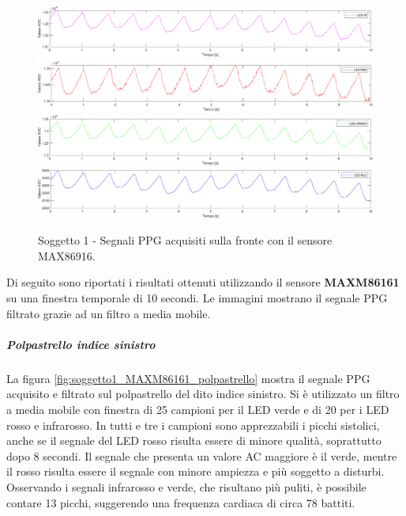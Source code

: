 \begin{figure}[h]
	\centering
	\includegraphics[width=1\linewidth]{ImageFiles/Misure Preliminari/Soggetto 1/MAX86916/fronte_ired}
	\includegraphics[width=1\linewidth]{ImageFiles/Misure Preliminari/Soggetto 1/MAX86916/fronte_red}
	\includegraphics[width=1\linewidth]{ImageFiles/Misure Preliminari/Soggetto 1/MAX86916/fronte_green}
	\includegraphics[width=1\linewidth]{ImageFiles/Misure Preliminari/Soggetto 1/MAX86916/fronte_blu}
	\caption{Soggetto 1 - Segnali PPG acquisiti sulla fronte con il sensore MAX86916.}
	\label{fig:soggetto1_MAX86916_fronte}
\end{figure}

\clearpage

Di seguito sono riportati i risultati ottenuti utilizzando il sensore \textbf{MAXM86161} su una finestra temporale di 10 secondi. Le immagini mostrano il segnale PPG filtrato grazie ad un filtro a media mobile.

\subparagraph{Polpastrello indice sinistro}

La figura \ref{fig:soggetto1_MAXM86161_polpastrello} mostra il segnale PPG acquisito e filtrato sul polpastrello del dito indice sinistro. Si è utilizzato un filtro a media mobile con finestra di 25 campioni per il LED verde  e di 20 per i LED rosso e infrarosso. In tutti e tre i campioni sono apprezzabili i picchi sistolici, anche se il segnale del LED rosso risulta essere di minore qualità, soprattutto dopo 8 secondi. Il segnale che presenta un valore AC maggiore è il verde, mentre il rosso risulta essere il segnale con minore ampiezza e più soggetto a disturbi. Osservando i segnali infrarosso e verde, che risultano più puliti, è possibile contare 13 picchi, suggerendo una frequenza cardiaca di circa 78 battiti.

